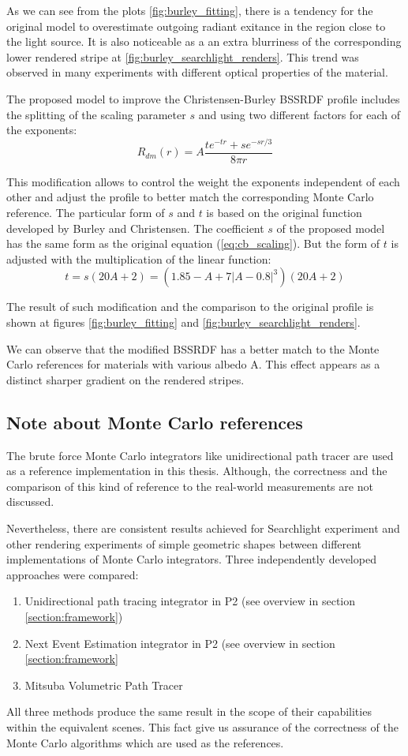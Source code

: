 As we can see from the plots \ref{fig:burley_fitting}, there is a tendency for
the original model to overestimate outgoing radiant exitance in the region close
to the light source. It is also noticeable as a an extra blurriness of the corresponding
lower rendered stripe at \ref{fig:burley_searchlight_renders}. This trend was observed in many
experiments with different optical properties of the material.

The proposed model to improve the Christensen-Burley BSSRDF profile includes the splitting of the
scaling parameter $s$ and using two different factors for each of the exponents:
\begin{equation}
\label{eq:burley_modified}
R_{dm}(r) = A\dfrac{te^{-tr}+se^{-sr/3}}{8\pi r}
\end{equation}

This modification allows to control the weight the exponents independent of each other and adjust
the profile to better match the corresponding Monte Carlo reference. The particular form of $s$ and
$t$ is based on the original function developed by Burley and Christensen. The coefficient $s$ of
the proposed model has the same form as the original equation (\ref{eq:cb_scaling}). But the form of
$t$ is adjusted with the multiplication of the linear function:
\begin{equation}
\label{eq:cb_scaling_modified}
t=s(20A+2)=(1.85-A + 7|A - 0.8|^3)(20A+2)
\end{equation}

The result of such modification and the comparison to the original profile is shown at figures
\ref{fig:burley_fitting} and \ref{fig:burley_searchlight_renders}.

We can observe that the modified BSSRDF has a better match to the Monte Carlo references for
materials with various albedo A. This effect appears as a distinct sharper gradient on the rendered
stripes.

\subsection{Note about Monte Carlo references}
The brute force Monte Carlo integrators like unidirectional path tracer are used as a reference
implementation in this thesis. Although, the correctness and the comparison of this kind of
reference to the real-world measurements are not discussed.

Nevertheless, there are consistent results achieved for Searchlight experiment and other rendering
experiments of simple geometric shapes between different implementations of Monte Carlo integrators.
Three independently developed approaches were compared:
\begin{enumerate}
  \item Unidirectional path tracing integrator in P2 (see overview in section
  \ref{section:framework})
  \item Next Event Estimation integrator in P2 (see overview in section \ref{section:framework}
  \item Mitsuba Volumetric Path Tracer \cite{Mitsuba}
\end{enumerate}

All three methods produce the same result in the scope of their capabilities within the equivalent
scenes. This fact give us assurance of the correctness of the Monte Carlo algorithms which are
used as the references.
